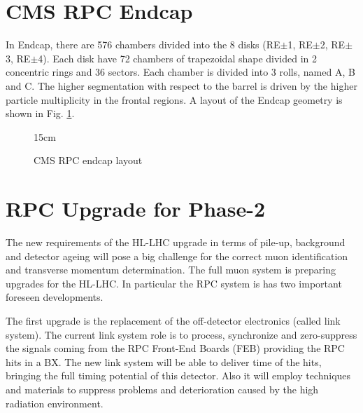 \section{CMS RPC Endcap}

In Endcap, there are 576 chambers divided into the 8 disks (RE$\pm$1, RE$\pm$2, RE$\pm$3, RE$\pm$4). Each disk have 72 chambers of trapezoidal shape divided in 2 concentric rings and 36 sectors. Each chamber is divided into 3 rolls, named A, B and C. The higher segmentation with respect to the barrel is driven by the higher particle multiplicity in the frontal regions. A layout of the Endcap geometry is shown in Fig. \ref{fig:RPC_endcap_layout}.

\begin{figure}[!htm]{15cm}
\caption{CMS RPC endcap layout}%
\label{fig:RPC_endcap_layout}
\end{figure}

\section{RPC Upgrade for Phase-2}

The new requirements of the HL-LHC upgrade in terms of pile-up,  background and detector ageing will pose a big challenge for the correct muon identification and transverse momentum determination. The full muon system is preparing upgrades for the HL-LHC. In particular the RPC system is has two important foreseen developments.

The first upgrade is the replacement of the off-detector electronics (called link system). The current link system role is to process, synchronize and zero-suppress the signals coming from the RPC Front-End Boards (FEB) providing the RPC hits in a BX. The new link system will be able to deliver time of the hits, bringing the full timing potential of this detector. Also it will employ techniques and materials to suppress problems and deterioration caused by the high radiation environment.

